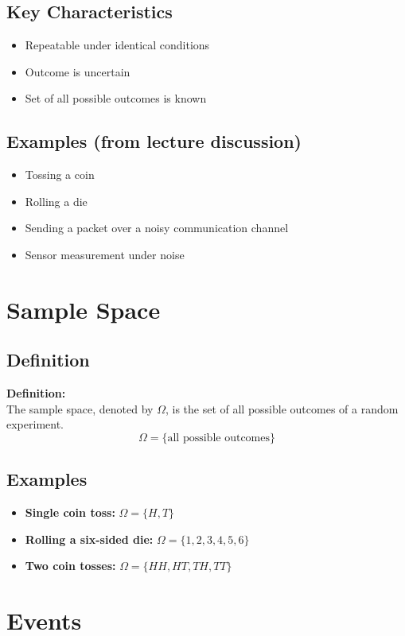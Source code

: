 \documentclass[11pt]{article}
\begin{document}
\subsection{Key Characteristics}
\begin{itemize}
    \item Repeatable under identical conditions
    \item Outcome is uncertain
    \item Set of all possible outcomes is known
\end{itemize}

\subsection{Examples (from lecture discussion)}
\begin{itemize}
    \item Tossing a coin
    \item Rolling a die
    \item Sending a packet over a noisy communication channel
    \item Sensor measurement under noise
\end{itemize}

\section{Sample Space}

\subsection{Definition}
\textbf{Definition:} \\
The sample space, denoted by $\Omega$, is the set of all possible outcomes of a random experiment.
\[ \Omega = \{ \text{all possible outcomes} \} \]

\subsection{Examples}
\begin{itemize}
    \item \textbf{Single coin toss:} $\Omega = \{H, T\}$
    \item \textbf{Rolling a six-sided die:} $\Omega = \{1, 2, 3, 4, 5, 6\}$
    \item \textbf{Two coin tosses:} $\Omega = \{HH, HT, TH, TT\}$
\end{itemize}

\section{Events}
\end{document}
